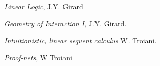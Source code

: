 \documentclass[12pt]{article}
\theoremstyle{plain}
\theoremstyle{definition}
\begin{document}
\begin{thebibliography}{9}
 \emph{Linear Logic}, J.Y. Girard

 \emph{Geometry of Interaction I}, J.Y. Girard.

 \emph{Intuitionistic, linear sequent calculus} W. Troiani.

 \emph{Proof-nets}, W Troiani

\end{thebibliography}
\end{document}

